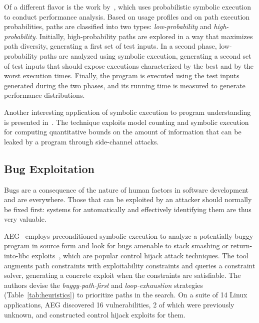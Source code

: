 Of a different flavor is the work by~\cite{CLL-ICSE16}, which uses probabilistic symbolic execution to conduct performance analysis. Based on usage profiles and on path execution probabilities, paths are classified into two types: {\em low-probability} and {\em high-probability}. Initially, high-probability paths are explored in a way that maximizes path diversity, generating a first set of test inputs. In a second phase, low-probability paths are analyzed using symbolic execution, generating a second set of test inputs that should expose executions characterized by the best and by the worst execution times. Finally, the program is executed using the test inputs generated during the two phases, and its running time is measured to generate performance distributions. 

Another interesting application of symbolic execution to program understanding is presented in~\cite{PPM-CSF18}. The technique exploits model counting and symbolic execution for computing quantitative bounds on the amount of information that can be leaked by a program through side-channel attacks. 
	

\subsection{Bug Exploitation}
\label{ss:bug-exploitation}
Bugs are a consequence of the nature of human factors in software development and are everywhere. Those that can be exploited by an attacker should normally be fixed first: systems for automatically and effectively identifying them are thus very valuable.

{\sc AEG}~\cite{AEG-NDSS11} employs preconditioned symbolic execution to analyze a potentially buggy program in source form and look for bugs amenable to stack smashing or return-into-libc exploits~\cite{PB-SSP04}, which are popular control hijack attack techniques. The tool augments path constraints with exploitability constraints and queries a constraint solver, generating a concrete exploit when the constraints are satisfiable. The authors devise the {\em buggy-path-first} and {\em loop-exhaustion} strategies (Table~\ref{tab:heuristics}) to prioritize paths in the search. On a suite of 14 Linux applications, {\sc AEG} discovered 16 vulnerabilities, 2 of which were previously unknown, and constructed control hijack exploits for them.

